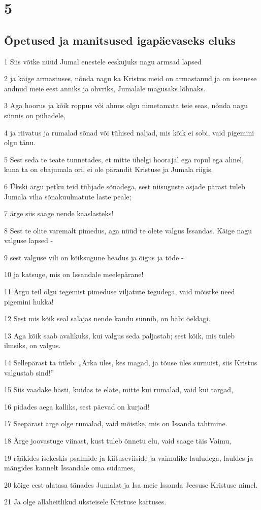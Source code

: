 \chapter{5}

\section*{Õpetused ja manitsused igapäevaseks eluks}

\par 1 Siis võtke nüüd Jumal enestele eeskujuks nagu armsad lapsed
\par 2 ja käige armastuses, nõnda nagu ka Kristus meid on armastanud ja on iseenese andnud meie eest anniks ja ohvriks, Jumalale magusaks lõhnaks.
\par 3 Aga hoorus ja kõik roppus või ahnus olgu nimetamata teie seas, nõnda nagu sünnis on pühadele,
\par 4 ja riivatus ja rumalad sõnad või tühised naljad, mis kõik ei sobi, vaid pigemini olgu tänu.
\par 5 Sest seda te teate tunnetades, et mitte ühelgi hoorajal ega ropul ega ahnel, kuna ta on ebajumala ori, ei ole pärandit Kristuse ja Jumala riigis.
\par 6 Ükski ärgu petku teid tühjade sõnadega, sest niisuguste asjade pärast tuleb Jumala viha sõnakuulmatute laste peale;
\par 7 ärge siis saage nende kaaslasteks!
\par 8 Sest te olite varemalt pimedus, aga nüüd te olete valgus Issandas. Käige nagu valguse lapsed -
\par 9 sest valguse vili on kõiksugune headus ja õigus ja tõde -
\par 10 ja katsuge, mis on Issandale meelepärane!
\par 11 Ärgu teil olgu tegemist pimeduse viljatute tegudega, vaid mõistke need pigemini hukka!
\par 12 Sest mis kõik seal salajas nende kaudu sünnib, on häbi öeldagi.
\par 13 Aga kõik saab avalikuks, kui valgus seda paljastab; sest kõik, mis tuleb ilmsiks, on valgus.
\par 14 Sellepärast ta ütleb: „Ärka üles, kes magad, ja tõuse üles surnuist, siis Kristus valgustab sind!”
\par 15 Siis vaadake hästi, kuidas te elate, mitte kui rumalad, vaid kui targad,
\par 16 pidades aega kalliks, sest päevad on kurjad!
\par 17 Seepärast ärge olge rumalad, vaid mõistke, mis on Issanda tahtmine.
\par 18 Ärge joovastuge viinast, kust tuleb õnnetu elu, vaid saage täis Vaimu,
\par 19 rääkides isekeskis psalmide ja kiituseviiside ja vaimulike lauludega, lauldes ja mängides kannelt Issandale oma südames,
\par 20 kõige eest alatasa tänades Jumalat ja Isa meie Issanda Jeesuse Kristuse nimel.
\par 21 Ja olge allaheitlikud üksteisele Kristuse kartuses.

